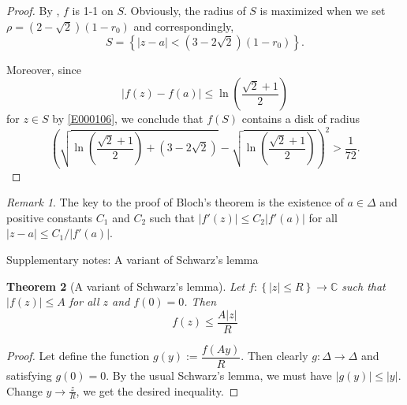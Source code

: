 \documentclass[11pt]{amsart}
\newtheorem{thm}{Theorem}[section]
\theoremstyle{remark}
\newtheorem{rem}[thm]{Remark}
\theoremstyle{definition}
\numberwithin{equation}{section}
\begin{document}
\begin{proof}
    By , $f$ is 1-1 on $S$. Obviously, the radius of $S$ is maximized when we set
    $\rho = (2-\sqrt{2})(1-r_0)$ and correspondingly,
    \begin{equation}\label{E000111}
        S = \left\{|z-a| < (3-2\sqrt{2})(1 - r_0)\right\}.
    \end{equation}

    Moreover, since
    \begin{equation}\label{E000109}
        |f(z) - f(a)| \le \ln\left(\frac{\sqrt{2}+1}{2}\right)
    \end{equation}
    for $z\in S$ by \eqref{E000106}, we conclude that $f(S)$ contains a disk of radius
    \begin{equation}\label{E000112}
        \left(\sqrt{\ln\left(\frac{\sqrt{2}+1}{2}\right) + (3 - 2\sqrt{2})}
        - \sqrt{\ln\left(\frac{\sqrt{2}+1}{2}\right)}\right)^2 > \frac{1}{72}.
    \end{equation}
\end{proof}

\begin{rem}\label{REM000900}
    The key to the proof of Bloch's theorem is the existence of $a\in \Delta$ and positive constants $C_1$ and $C_2$ such that
    $|f'(z)| \le C_2 |f'(a)|$ for all $|z-a| \le C_1/|f'(a)|$.
\end{rem}

Supplementary notes: A variant of Schwarz's lemma
\begin{thm}[A variant of Schwarz's lemma]

    Let $f \colon \left\lbrace |z| \le R \right\rbrace  \to \mathbb{C}$ such that $|f(z)| \le A$ for all $z$ and $f(0)=0$.
    Then
    \[f(z) \le \dfrac{A|z|}{R}\]
\end{thm}
\begin{proof}
    Let define the function $g(y):=\dfrac{f(Ay)}{R}$. Then clearly $g \colon \Delta \to \Delta$ and
    satisfying $g(0)=0$. By the usual Schwarz's lemma, we must have $|g(y)| \le |y|$. Change $y \to \frac{z}{R}$, we get the desired inequality.
\end{proof}
\end{document}
